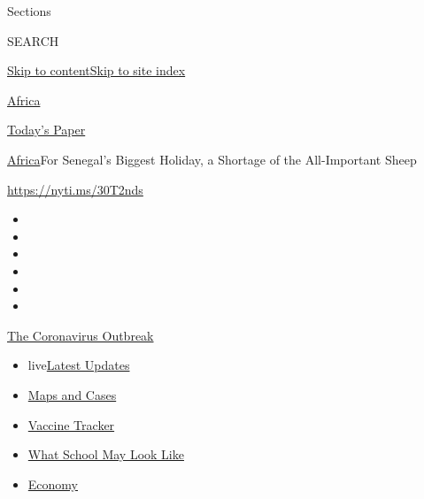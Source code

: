 Sections

SEARCH

\protect\hyperlink{site-content}{Skip to
content}\protect\hyperlink{site-index}{Skip to site index}

\href{https://www.nytimes.com/section/world/africa}{Africa}

\href{https://myaccount.nytimes.com/auth/login?response_type=cookie\&client_id=vi}{}

\href{https://www.nytimes.com/section/todayspaper}{Today's Paper}

\href{/section/world/africa}{Africa}\textbar{}For Senegal's Biggest
Holiday, a Shortage of the All-Important Sheep

\url{https://nyti.ms/30T2nds}

\begin{itemize}
\item
\item
\item
\item
\item
\item
\end{itemize}

\href{https://www.nytimes.com/news-event/coronavirus?action=click\&pgtype=Article\&state=default\&region=TOP_BANNER\&context=storylines_menu}{The
Coronavirus Outbreak}

\begin{itemize}
\tightlist
\item
  live\href{https://www.nytimes.com/2020/08/01/world/coronavirus-covid-19.html?action=click\&pgtype=Article\&state=default\&region=TOP_BANNER\&context=storylines_menu}{Latest
  Updates}
\item
  \href{https://www.nytimes.com/interactive/2020/us/coronavirus-us-cases.html?action=click\&pgtype=Article\&state=default\&region=TOP_BANNER\&context=storylines_menu}{Maps
  and Cases}
\item
  \href{https://www.nytimes.com/interactive/2020/science/coronavirus-vaccine-tracker.html?action=click\&pgtype=Article\&state=default\&region=TOP_BANNER\&context=storylines_menu}{Vaccine
  Tracker}
\item
  \href{https://www.nytimes.com/interactive/2020/07/29/us/schools-reopening-coronavirus.html?action=click\&pgtype=Article\&state=default\&region=TOP_BANNER\&context=storylines_menu}{What
  School May Look Like}
\item
  \href{https://www.nytimes.com/live/2020/07/31/business/stock-market-today-coronavirus?action=click\&pgtype=Article\&state=default\&region=TOP_BANNER\&context=storylines_menu}{Economy}
\end{itemize}

